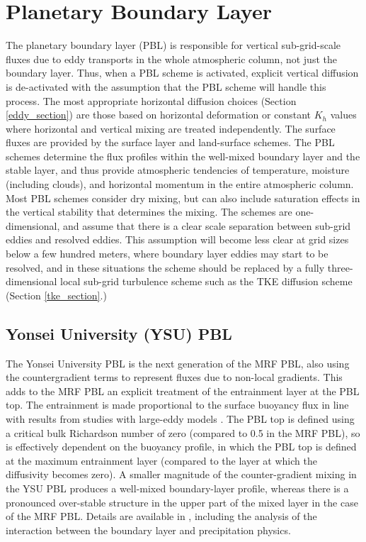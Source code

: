 \section{Planetary Boundary Layer}

The planetary boundary layer (PBL) is responsible for vertical sub-grid-scale 
fluxes due to eddy transports in the whole atmospheric column, not just the 
boundary layer. Thus, when a PBL scheme is activated, explicit vertical 
diffusion is de-activated with the assumption that the PBL scheme will 
handle this process. The most appropriate horizontal diffusion choices
(Section \ref{eddy_section}) are those based on horizontal deformation
or constant $K_h$ values where horizontal and vertical mixing are treated
independently. The surface fluxes are provided by the surface layer 
and land-surface schemes. The PBL schemes determine the flux profiles 
within the well-mixed boundary layer and the stable layer, and thus provide 
atmospheric tendencies of temperature, moisture (including clouds), and 
horizontal momentum in the entire atmospheric column. Most PBL schemes 
consider dry mixing, but can also include saturation effects in the vertical 
stability that determines the mixing. The schemes are one-dimensional, and 
assume that there is a clear scale separation between sub-grid eddies and 
resolved eddies. This assumption will become less clear at grid sizes below a 
few hundred meters, where boundary layer eddies may start to be resolved, and
in these situations the scheme should be replaced by a fully three-dimensional
local sub-grid turbulence scheme such as the TKE diffusion scheme (Section
\ref{tke_section}.)

\subsection{Yonsei University (YSU) PBL}

The Yonsei University PBL \citep{hong06} is the next generation of the MRF PBL, also using the countergradient terms to represent fluxes due to non-local gradients. This adds to the MRF PBL \citep{hong96} an explicit treatment of the entrainment layer at the PBL top. The entrainment is made proportional to the surface buoyancy flux in line with results from studies with large-eddy models \citep{noh03}. The PBL top is defined using a critical bulk Richardson number of zero (compared to 0.5 in the MRF PBL), so is effectively dependent on the buoyancy profile, in which the PBL top is defined at the maximum entrainment layer (compared to the layer at which the diffusivity becomes zero). A smaller magnitude of the counter-gradient mixing in the YSU PBL produces a well-mixed boundary-layer profile, whereas there is a pronounced over-stable structure in the upper part of the mixed layer in the case of the MRF PBL. Details are available in \citet{hong06}, including the analysis of the interaction between the boundary layer and precipitation physics. 

